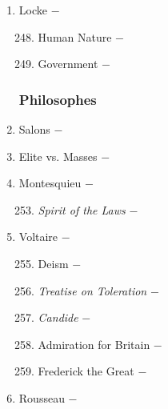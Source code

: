 \documentclass[12pt]{article}
\begin{document}
\begin{enumerate}
\item Locke $-$ 

\begin{enumerate}[label=\arabic{*}.]
\setcounter{enumii}{247}

\item Human Nature $-$ 

\item Government $-$

\end{enumerate}
\setcounter{enumi}{249}
\subsubsection{Philosophes}

\item Salons $-$ 

\item Elite vs. Masses $-$

\item Montesquieu $-$ 

\begin{enumerate}[label=\arabic{*}.]
\setcounter{enumii}{252}

\item \textit{Spirit of the Laws} $-$

\end{enumerate}
\setcounter{enumi}{253}

\item Voltaire $-$ 

\begin{enumerate}[label=\arabic{*}.]
\setcounter{enumii}{254}

\item Deism $-$ 

\item \textit{Treatise on Toleration} $-$

\item \textit{Candide} $-$ 

\item Admiration for Britain $-$ 

\item Frederick the Great $-$

\end{enumerate}
\setcounter{enumi}{259}

\item Rousseau $-$ 

\begin{enumerate}[label=\arabic{*}.]
\setcounter{enumii}{260}


\end{enumerate}
\end{enumerate}
\end{document}
